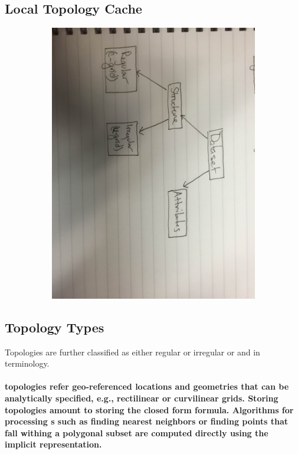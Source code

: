 \subsection{Local Topology Cache}
\begin{figure}[ht!]
  \centering
  \begin{subfigure}[t]{0.45\textwidth}
    \includegraphics[width=\textwidth]{../figs/data_hierarchy_rough}
  \end{subfigure}
\end{figure}

\subsection{Topology Types}
Topologies are further classified as either regular or irregular or
{\bf \cgrid{}} and {\bf \ugrid} in \sciwms{} terminology.
\paragraph{{\bf \cgrid{}} topologies refer geo-referenced locations and geometries that can be analytically specified, e.g., rectilinear
or curvilinear grids. Storing \cgrid{} topologies amount to storing
the closed form formula. Algorithms for processing \cgrid{}s such as
finding nearest neighbors or finding points that fall withing a
polygonal subset are computed directly using the implicit \cgrid{}
representation.}

